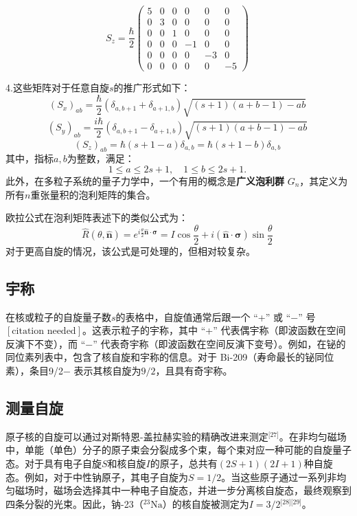 \[
S_z = \frac{\hbar}{2}
\begin{pmatrix}
5 & 0 & 0 & 0 & 0 & 0 \\
0 & 3 & 0 & 0 & 0 & 0 \\
0 & 0 & 1 & 0 & 0 & 0 \\
0 & 0 & 0 & -1 & 0 & 0 \\
0 & 0 & 0 & 0 & -3 & 0 \\
0 & 0 & 0 & 0 & 0 & -5
\end{pmatrix}~
\]

4.这些矩阵对于任意自旋\(s\)的推广形式如下：
\[
(S_x)_{ab} = \frac{\hbar}{2} \left( \delta_{a,b+1} + \delta_{a+1,b} \right) \sqrt{(s+1)(a+b-1) - ab}~
\]
\[
(S_y)_{ab} = \frac{i\hbar}{2} \left( \delta_{a,b+1} - \delta_{a+1,b} \right) \sqrt{(s+1)(a+b-1) - ab}~
\]
\[
(S_z)_{ab} = \hbar (s+1 - a) \delta_{a,b} = \hbar (s+1 - b) \delta_{a,b}~
\]
其中，指标\(a, b\)为整数，满足：
\[
1 \leq a \leq 2s+1, \quad 1 \leq b \leq 2s+1.~
\]
此外，在多粒子系统的量子力学中，一个有用的概念是\textbf{广义泡利群} \(G_n\)，其定义为所有\(n\)重张量积的泡利矩阵的集合。

欧拉公式在泡利矩阵表述下的类似公式为：
\[
\hat{R}(\theta, \hat{\mathbf{n}}) = e^{i \frac{\theta}{2} \hat{\mathbf{n}} \cdot \boldsymbol{\sigma}} = I \cos \frac{\theta}{2} + i \left(\hat{\mathbf{n}} \cdot \boldsymbol{\sigma}\right) \sin \frac{\theta}{2}~
\]
对于更高自旋的情况，该公式是可处理的，但相对较复杂。
\subsection{宇称} 
在核或粒子的自旋量子数\(s\)的表格中，自旋值通常后跟一个 “+” 或 “−” 号\([\text{citation needed}]\)。这表示粒子的宇称，其中 “+” 代表偶宇称（即波函数在空间反演下不变），而 “−” 代表奇宇称（即波函数在空间反演下变号）。例如，在铋的同位素列表中，包含了核自旋和宇称的信息。对于 Bi-209（寿命最长的铋同位素），条目9/2− 表示其核自旋为\( 9/2 \)，且具有奇宇称。
\subsection{测量自旋}  
原子核的自旋可以通过对斯特恩-盖拉赫实验的精确改进来测定\(^\text{[27]}\)。在非均匀磁场中，单能（单色）分子的原子束会分裂成多个束，每个束对应一种可能的自旋量子态。对于具有电子自旋\(S\)和核自旋\(I\)的原子，总共有\((2S + 1)(2I + 1)\)种自旋态。例如，对于中性钠原子，其电子自旋为\( S = 1/2\)。当这些原子通过一系列非均匀磁场时，磁场会选择其中一种电子自旋态，并进一步分离核自旋态，最终观察到四条分裂的光束。因此，钠-23（\( ^{23}\text{Na} \)）的核自旋被测定为\( I = 3/2 \)\(^\text{[28][29]}\)。

